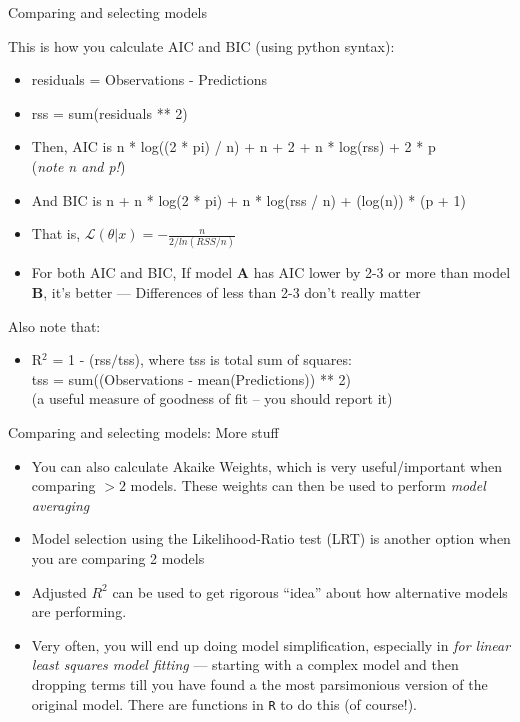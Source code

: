 \documentclass[xcolor=x11names,compress]{beamer}
\renewcommand{\(}{\begin{columns}}
\renewcommand{\)}{\end{columns}}
\newcommand{\<}[1]{\begin{column}{#1}}
\renewcommand{\>}{\end{column}}
\begin{document}
\begin{frame}{Comparing and selecting models}

This is how you calculate AIC and BIC (using python syntax): 

\pause
\begin{itemize}
\small
	\item residuals = Observations - Predictions
	\item rss = sum(residuals ** 2) 
	\item Then, AIC is n * log((2 * pi) / n) + n + 2 + n * log(rss) + 2 * p \\
		({\it note n and p!})
	\item And BIC is n + n * log(2 * pi) + n * log(rss / n) + (log(n)) * (p + 1)

	\item That is, 	$ \mathcal{L}(\theta |x) = -\frac{n}{2/ln(RSS/n)}$
	\item For both AIC and BIC, If model {\bf A} has AIC lower by 2-3 or 
	more than model {\bf B}, it's better --- Differences of less than 2-3 
	don't really matter

\end{itemize}

    \pause
Also note that:
\begin{itemize}
\small
	\item R$^{2}$ = 1 - (rss$/$tss), where tss is total sum of squares: \\
tss = sum((Observations - mean(Predictions)) ** 2)\\
(a useful measure of goodness of fit -- you should report it)

\end{itemize}

\end{frame}


\begin{frame}{Comparing and selecting models: More stuff}

\begin{itemize} \itemsep12pt
	\item You can also calculate Akaike Weights, which is very useful/important when comparing $
	> 2$ models. These weights can then be used to perform {\it model averaging}

	\item Model selection using the Likelihood-Ratio test (LRT) is another option when you are comparing 2 models
	
	\item Adjusted $R^2$ can be used to get rigorous ``idea'' about how alternative models are performing. 
	
	\item Very often, you will end up doing  model simplification, especially in {\it for linear least squares model fitting} --- starting with a complex model and then dropping terms till you have found a the most parsimonious version of the original model. There are functions in {\tt R} to do this (of course!). 
\end{itemize}

\end{frame}
\end{document}
